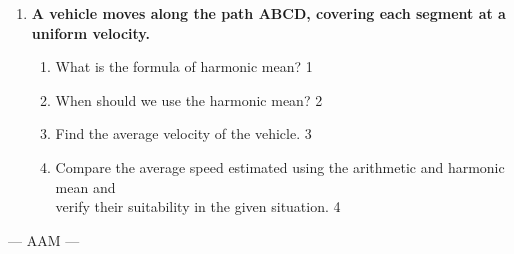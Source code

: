 \documentclass[12pt]{article}
\begin{document}
  \begin{enumerate}

 \item
  \textbf{A vehicle moves along the path ABCD, covering each segment at a uniform velocity.}

\begin{center}

  \end{center}
  \begin{enumerate}
    \item
	What is the formula of harmonic mean? \hfill 1
    \item
	When should we use the harmonic mean? \hfill 2
    \item  
	Find the average velocity of the vehicle. \hfill 3
    \item
	Compare the average speed estimated using the arithmetic and harmonic mean and \\ verify their suitability in the given situation. \hfill 4
  \end{enumerate}

\end{enumerate}
\begin{center}
--- AAM ---
\end{center}
  \vspace{1cm}
  
\end{document}
